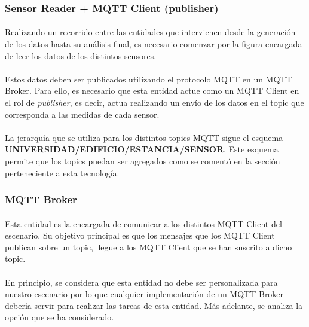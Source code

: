 \documentclass[12pt, a4paper]{article}
\begin{document}
        \subsubsection{Sensor Reader + MQTT Client (publisher)}

        \paragraph{}
        Realizando un recorrido entre las entidades que intervienen desde la generación de los datos hasta su análisis final, es necesario comenzar por la figura encargada de leer los datos de los distintos sensores.

        \paragraph{}
        Estos datos deben ser publicados utilizando el protocolo MQTT en un MQTT Broker. Para ello, es necesario que esta entidad actue como un MQTT Client en el rol de \textit{publisher}, es decir, actua realizando un envío de los datos en el topic que corresponda a las medidas de cada sensor.

        \paragraph{}
        La jerarquía que se utiliza para los distintos topics MQTT sigue el esquema \textbf{UNIVERSIDAD/EDIFICIO/ESTANCIA/SENSOR}. Este esquema permite que los topics puedan ser agregados como se comentó en la sección perteneciente a esta tecnología.

        \subsubsection{MQTT Broker}

        \paragraph{}
        Esta entidad es la encargada de comunicar a los distintos MQTT Client del escenario. Su objetivo principal es que los mensajes que los MQTT Client publican sobre un topic, llegue a los MQTT Client que se han suscrito a dicho topic.

        \paragraph{}
        En principio, se considera que esta entidad no debe ser personalizada para nuestro escenario por lo que cualquier implementación de un MQTT Broker debería servir para realizar las tareas de esta entidad. Más adelante, se analiza la opción que se ha considerado.
\end{document}
